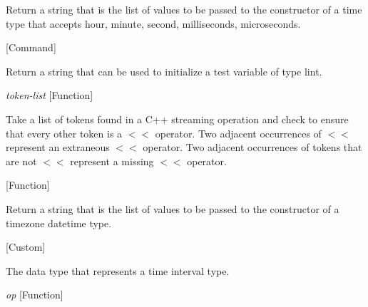 \begin{doc-string}
Return a string that is the list of values to be passed to the constructor of
 a time type that accepts hour, minute, second,  milliseconds, microseconds.
\end{doc-string}

\vspace{1em}
\noindent
{}
\usebox{\funcname}
 \hfill [Command]

\begin{doc-string}
Return a string that can be used to initialize a test variable of type lint.
\end{doc-string}

\vspace{1em}
\noindent
{}
\usebox{\funcname}\emph{token-list}
 \hfill [Function]

\begin{doc-string}
Take a list of tokens found in a C++ streaming operation and check to
ensure that every other token is a $<$$<$ operator.  Two adjacent occurrences of $<$$<$
represent an extraneous $<$$<$ operator.  Two adjacent occurrences of tokens that
are not $<$$<$ represent a missing $<$$<$ operator.
\end{doc-string}

\vspace{1em}
\noindent
{}
\usebox{\funcname}
 \hfill [Function]

\begin{doc-string}
Return a string that is the list of values to be passed to the constructor of
a timezone datetime type.
\end{doc-string}

\vspace{1em}
\noindent
{}
\usebox{\funcname}
 \hfill [Custom]

\begin{doc-string}
The data type that represents a time interval type.
\end{doc-string}

\vspace{1em}
\noindent
{}
\usebox{\funcname}\emph{op}
 \hfill [Function]


